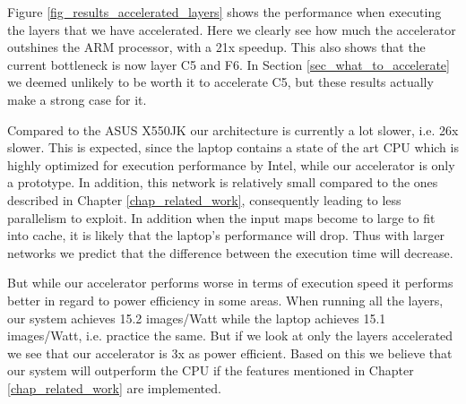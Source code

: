 Figure \ref{fig_results_accelerated_layers} shows the performance when executing the layers that we have accelerated. Here we clearly see how much the accelerator outshines the ARM processor, with a 21x speedup. This also shows that the current bottleneck is now layer C5 and F6. In Section \ref{sec_what_to_accelerate} we deemed unlikely to be worth it to accelerate C5, but these results actually make a strong case for it. 

Compared to the ASUS X550JK our architecture is currently a lot slower, i.e. 26x slower. This is expected, since the laptop contains a state of the art CPU which is highly optimized for execution performance by Intel, while our accelerator is only a prototype. In addition, this network is relatively small compared to the ones described in Chapter \ref{chap_related_work}, consequently leading to less parallelism to exploit. In addition when the input maps become to large to fit into cache, it is likely that the laptop's performance will drop. Thus with larger networks we predict that the difference between the execution time will decrease.

But while our accelerator performs worse in terms of execution speed it performs better in regard to power efficiency in some areas. When running all the layers, our system achieves 15.2 images/Watt while the laptop achieves 15.1 images/Watt, i.e. practice the same. But if we look at only the layers accelerated we see that our accelerator is 3x as power efficient. Based on this we believe that our system will outperform the CPU if the features mentioned in Chapter \ref{chap_related_work} are implemented.  
